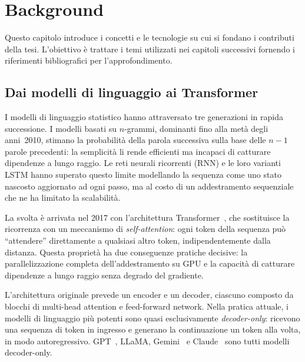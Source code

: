 
\chapter{Background}
\label{chap:background}

Questo capitolo introduce i concetti e le tecnologie su cui si fondano i contributi della tesi. 
L'obiettivo è trattare i temi utilizzati nei capitoli successivi 
fornendo i riferimenti bibliografici per l'approfondimento. 

\section{Dai modelli di linguaggio ai Transformer}
\label{sec:bg-transformer}

I modelli di linguaggio statistico hanno attraversato tre generazioni in rapida successione. 
I modelli basati su $n$-grammi, dominanti fino alla metà degli anni~2010, stimano la probabilità della parola successiva sulla base delle $n-1$ parole precedenti: 
la semplicità li rende efficienti ma incapaci di catturare dipendenze a lungo raggio. 
Le reti neurali ricorrenti (RNN) e le loro varianti LSTM hanno superato questo limite modellando la sequenza come uno stato nascosto aggiornato ad ogni passo, 
ma al costo di un addestramento sequenziale che ne ha limitato la scalabilità.

La svolta è arrivata nel 2017 con l'architettura Transformer~\cite{vaswani2017attention}, 
che sostituisce la ricorrenza con un meccanismo di \emph{self-attention}: 
ogni token della sequenza può ``attendere'' direttamente a qualsiasi altro token, indipendentemente dalla distanza. 
Questa proprietà ha due conseguenze pratiche decisive: 
la parallelizzazione completa dell'addestramento su GPU e la capacità di catturare 
dipendenze a lungo raggio senza degrado del gradiente.

L'architettura originale prevede un encoder e un decoder, ciascuno composto da blocchi di multi-head attention e feed-forward network. 
Nella pratica attuale, i modelli di linguaggio più potenti sono quasi esclusivamente \emph{decoder-only}: 
ricevono una sequenza di token in ingresso e generano la continuazione un token alla volta, in modo autoregressivo. 
GPT~\cite{brown2020gpt3}, LLaMA, Gemini~\cite{team2024gemini} e Claude~\cite{anthropic2024claude} sono tutti modelli decoder-only.

